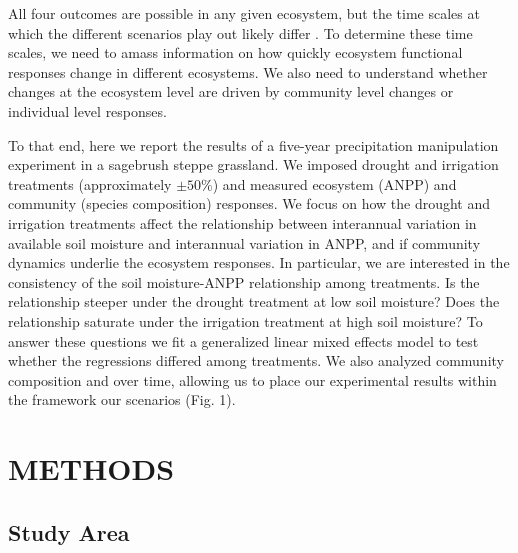 \documentclass[fleqn,10pt,lineno]{wlpeerj} %
\begin{document}
All four outcomes are possible in any given ecosystem, but the time
scales at which the different scenarios play out likely differ
\citep{Smith2009, Wilcox2016, Knapp2017}. To determine these time
scales, we need to amass information on how quickly ecosystem functional
responses change in different ecosystems. We also need to understand
whether changes at the ecosystem level are driven by community level
changes or individual level responses.

To that end, here we report the results of a five-year precipitation
manipulation experiment in a sagebrush steppe grassland. We imposed
drought and irrigation treatments (approximately \(\pm50\%\)) and
measured ecosystem (ANPP) and community (species composition) responses.
We focus on how the drought and irrigation treatments affect the
relationship between interannual variation in available soil moisture
and interannual variation in ANPP, and if community dynamics underlie
the ecosystem responses. In particular, we are interested in the
consistency of the soil moisture-ANPP relationship among treatments. Is
the relationship steeper under the drought treatment at low soil
moisture? Does the relationship saturate under the irrigation treatment
at high soil moisture? To answer these questions we fit a generalized
linear mixed effects model to test whether the regressions differed
among treatments. We also analyzed community composition and
 over
time, allowing us to place our experimental results within the framework
our scenarios (Fig. 1).

\section{METHODS}\label{methods}

\subsection{Study Area}\label{study-area}
\end{document}
